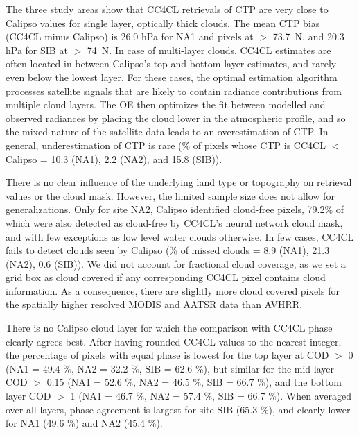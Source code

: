 The three study areas show that CC4CL retrievals of CTP are very close to Calipso values for single layer, optically thick clouds. The mean CTP bias (CC4CL minus Calipso) is 26.0 hPa for NA1 and pixels at $>$ 73.7\textdegree\ N, and 20.3 hPa for SIB at $>$ 74\textdegree\ N. In case of multi-layer clouds, CC4CL estimates are often located in between Calipso's top and bottom layer estimates, and rarely even below the lowest layer. For these cases, the optimal estimation algorithm processes satellite signals that are likely to contain radiance contributions from multiple cloud layers. The OE then optimizes the fit between modelled and observed radiances by placing the cloud lower in the atmospheric profile, and so the mixed nature of the satellite data leads to an overestimation of CTP. In general, underestimation of CTP is rare (\% of pixels whose CTP is CC4CL $<$ Calipso = 10.3 (NA1), 2.2 (NA2), and 15.8 (SIB)).

There is no clear influence of the underlying land type or topography on retrieval values or the cloud mask. However, the limited sample size does not allow for generalizations. Only for site NA2, Calipso identified cloud-free pixels, 79.2\% of which were also detected as cloud-free by CC4CL's neural network cloud mask, and with few exceptions as low level water clouds otherwise. In few cases, CC4CL fails to detect clouds seen by Calipso (\% of missed clouds = 8.9 (NA1), 21.3 (NA2), 0.6 (SIB)). We did not account for fractional cloud coverage, as we set a grid box as cloud covered if any corresponding CC4CL pixel contains cloud information. As a consequence, there are slightly more cloud covered pixels for the spatially higher resolved MODIS and AATSR data than AVHRR.

There is no Calipso cloud layer for which the comparison with CC4CL phase clearly agrees best. After having rounded CC4CL values to the nearest integer, the percentage of pixels with equal phase is lowest for the top layer at COD $>$ 0 (NA1 = 49.4 \%, NA2 = 32.2 \%, SIB = 62.6 \%), but similar for the mid layer COD $>$ 0.15 (NA1 = 52.6 \%, NA2 = 46.5 \%, SIB = 66.7 \%), and the bottom layer COD $>$ 1 (NA1 = 46.7 \%, NA2 = 57.4 \%, SIB = 66.7 \%). When averaged over all layers, phase agreement is largest for site SIB (65.3 \%), and clearly lower for NA1 (49.6 \%) and NA2 (45.4 \%).

